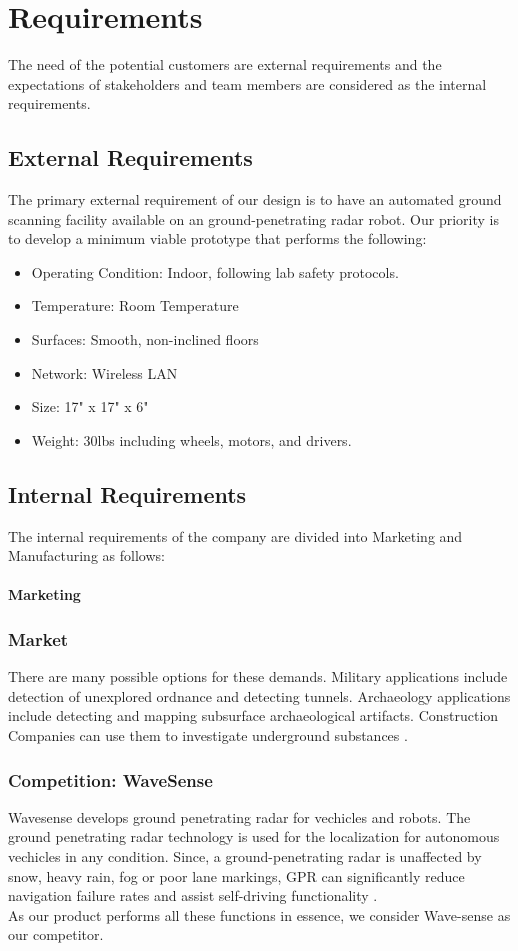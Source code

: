 \section{Requirements}

The need of the potential customers are external requirements and the expectations of stakeholders and team members are considered as the internal requirements.
\subsection{External Requirements}
The primary external requirement of our design is to have an automated  ground scanning facility available on an ground-penetrating radar robot. Our priority is to develop a minimum viable prototype that performs the following:
\begin{itemize}
	\item Operating Condition: Indoor, following lab safety protocols.
	\item Temperature: Room Temperature
	\item Surfaces: Smooth, non-inclined floors
	\item Network: Wireless LAN
	\item Size: 17" x 17" x 6"
	\item Weight: 30lbs including wheels, motors, and drivers.
\end{itemize}

\subsection{Internal Requirements}
The internal requirements of the company are divided into Marketing and Manufacturing as follows:\\\\

\textbf{Marketing}
\subsubsection{Market} There are many possible options for these demands. Military applications include detection of unexplored ordnance and detecting tunnels. Archaeology applications include detecting and mapping subsurface archaeological artifacts. Construction Companies can use them to investigate underground substances \cite{andrews1999research}.

\subsubsection{Competition: WaveSense}
Wavesense develops ground penetrating radar for vechicles and robots. The ground penetrating radar technology is used for the localization for autonomous vechicles in any condition. Since, a ground-penetrating radar is unaffected by snow, heavy rain, fog or poor lane markings, GPR can significantly reduce navigation failure rates and assist self-driving functionality \cite{wavesense2020}. \\
As our product performs all these functions in essence, we consider Wave-sense as our competitor.

